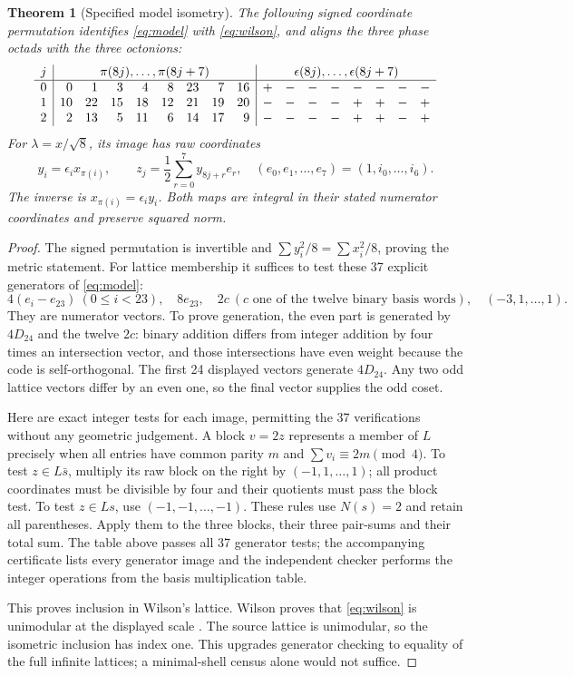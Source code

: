 \documentclass[10pt,reqno]{amsart}
\newtheorem{theorem}{Theorem}
\theoremstyle{remark}\newtheorem{remark}[theorem]{Remark}
\begin{document}
\begin{theorem}[Specified model isometry]\label{thm:isometry}
The following signed coordinate permutation identifies \eqref{eq:model} with \eqref{eq:wilson}, and aligns the three phase octads with the three octonions:
\[
\begin{array}{c|rrrrrrrr|rrrrrrrr}
j&\multicolumn{8}{c|}{\pi(8j),\ldots,\pi(8j+7)}&\multicolumn{8}{c}{\epsilon(8j),\ldots,\epsilon(8j+7)}\\\hline
0&0&1&3&4&8&23&7&16&+&-&-&-&-&-&-&-\\
1&10&22&15&18&12&21&19&20&-&-&-&-&+&+&-&+\\
2&2&13&5&11&6&14&17&9&-&-&-&-&+&+&-&+
\end{array}
\]
For $\lambda=x/\sqrt8$, its image has raw coordinates
\[
y_i=\epsilon_i x_{\pi(i)},\qquad
z_j=\frac12\sum_{r=0}^7y_{8j+r}e_r,
\quad(e_0,e_1,\ldots,e_7)=(1,i_0,\ldots,i_6).
\]
The inverse is $x_{\pi(i)}=\epsilon_i y_i$. Both maps are integral in their stated numerator coordinates and preserve squared norm.
\end{theorem}
\begin{proof}
The signed permutation is invertible and $\sum y_i^2/8=\sum x_i^2/8$, proving the metric statement. For lattice membership it suffices to test these 37 explicit generators of \eqref{eq:model}:
\[
4(e_i-e_{23})\ (0\le i<23),\quad8e_{23},\quad
2c\ (c\text{ one of the twelve binary basis words}),\quad
(-3,1,\ldots,1).
\]
They are numerator vectors. To prove generation, the even part is generated by $4D_{24}$ and the twelve $2c$: binary addition differs from integer addition by four times an intersection vector, and those intersections have even weight because the code is self-orthogonal. The first 24 displayed vectors generate $4D_{24}$. Any two odd lattice vectors differ by an even one, so the final vector supplies the odd coset.

Here are exact integer tests for each image, permitting the 37 verifications without any geometric judgement. A block $v=2z$ represents a member of $L$ precisely when all entries have common parity $m$ and $\sum v_i\equiv2m\pmod4$. To test $z\in L\bar s$, multiply its raw block on the right by $(-1,1,\ldots,1)$; all product coordinates must be divisible by four and their quotients must pass the block test. To test $z\in Ls$, use $(-1,-1,\ldots,-1)$. These rules use $N(s)=2$ and retain all parentheses. Apply them to the three blocks, their three pair-sums and their total sum. The table above passes all 37 generator tests; the accompanying certificate lists every generator image and the independent checker performs the integer operations from the basis multiplication table.

This proves inclusion in Wilson's lattice. Wilson proves that \eqref{eq:wilson} is unimodular at the displayed scale \cite[Sections 3--4]{wilson}. The source lattice is unimodular, so the isometric inclusion has index one. This upgrades generator checking to equality of the full infinite lattices; a minimal-shell census alone would not suffice.
\end{proof}
\end{document}
